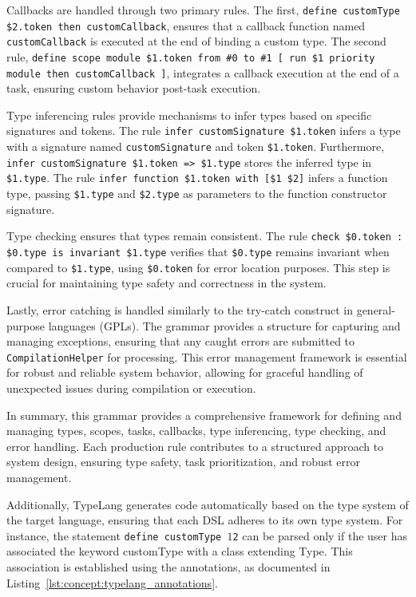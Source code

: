 Callbacks are handled through two primary rules. The first, \texttt{define customType \$2.token then customCallback}, ensures that a callback function named \linebreak \texttt{customCallback} is executed at the end of binding a custom type. The second rule, \texttt{define scope module \$1.token from \#0 to \#1 [ run \$1 priority module then customCallback ]}, integrates a callback execution at the end of a task, ensuring custom behavior post-task execution.

Type inferencing rules provide mechanisms to infer types based on specific signatures and tokens. The rule \texttt{infer customSignature \$1.token} infers a type with a signature named \texttt{customSignature} and token \texttt{\$1.token}. Furthermore, \texttt{infer customSignature \$1.token => \$1.type} stores the inferred type in \texttt{\$1.type}. The rule \texttt{infer function \$1.token with [\$1 \$2]} infers a function type, passing \texttt{\$1.type} and \texttt{\$2.type} as parameters to the function constructor signature.

Type checking ensures that types remain consistent. The rule \texttt{check \$0.token : \$0.type is invariant \$1.type} verifies that \texttt{\$0.type} remains invariant when compared to \texttt{\$1.type}, using \texttt{\$0.token} for error location purposes. This step is crucial for maintaining type safety and correctness in the system.

Lastly, error catching is handled similarly to the try-catch construct in general-purpose languages (GPLs). The grammar provides a structure for capturing and managing exceptions, ensuring that any caught errors are submitted to \texttt{CompilationHelper} for processing. This error management framework is essential for robust and reliable system behavior, allowing for graceful handling of unexpected issues during compilation or execution.

In summary, this grammar provides a comprehensive framework for defining and managing types, scopes, tasks, callbacks, type inferencing, type checking, and error handling. Each production rule contributes to a structured approach to system design, ensuring type safety, task prioritization, and robust error management.

Additionally, TypeLang generates code automatically based on the type system of the target language, ensuring that each DSL adheres to its own type system. For instance, the statement \texttt{define customType $1 $2} can be parsed only if the user has associated the keyword customType with a class extending Type. This association is established using the annotations, as documented in Listing~\ref{lst:concept:typelang_annotations}.

